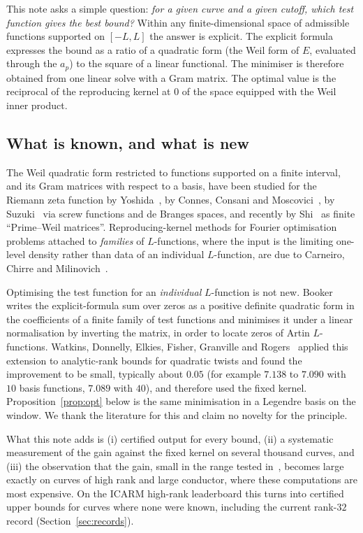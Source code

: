 \documentclass[11pt]{amsart}
\renewcommand{\S}{\ensuremath{\mathsection}}
\theoremstyle{remark}
\theoremstyle{definition}
\begin{document}
This note asks a simple question: \emph{for a given curve and a given cutoff, which test function gives the best bound?} Within any finite-dimensional space of admissible functions supported on $[-L,L]$ the answer is explicit. The explicit formula expresses the bound as a ratio of a quadratic form (the Weil form of $E$, evaluated through the $a_p$) to the square of a linear functional. The minimiser is therefore obtained from one linear solve with a Gram matrix. The optimal value is the reciprocal of the reproducing kernel at $0$ of the space equipped with the Weil inner product.

\subsection*{What is known, and what is new}
The Weil quadratic form restricted to functions supported on a finite interval, and its Gram matrices with respect to a basis, have been studied for the Riemann zeta function by Yoshida~\cite{Yoshida}, by Connes, Consani and Moscovici~\cite{CCM}, by Suzuki~\cite{Suzuki} via screw functions and de Branges spaces, and recently by Shi~\cite{Shi} as finite ``Prime--Weil matrices''. Reproducing-kernel methods for Fourier optimisation problems attached to \emph{families} of $L$-functions, where the input is the limiting one-level density rather than data of an individual $L$-function, are due to Carneiro, Chirre and Milinovich~\cite{CCMil}.

Optimising the test function for an \emph{individual} $L$-function is not new. Booker~\cite[\S3]{Booker} writes the explicit-formula sum over zeros as a positive definite quadratic form in the coefficients of a finite family of test functions and minimises it under a linear normalisation by inverting the matrix, in order to locate zeros of Artin $L$-functions. Watkins, Donnelly, Elkies, Fisher, Granville and Rogers~\cite[\S7]{Watkins} applied this extension to analytic-rank bounds for quadratic twists and found the improvement to be small, typically about $0.05$ (for example $7.138$ to $7.090$ with $10$ basis functions, $7.089$ with $40$), and therefore used the fixed kernel. Proposition~\ref{prop:opt} below is the same minimisation in a Legendre basis on the window. We thank the literature for this and claim no novelty for the principle.

What this note adds is (i) certified output for every bound, (ii) a systematic measurement of the gain against the fixed kernel on several thousand curves, and (iii) the observation that the gain, small in the range tested in~\cite{Watkins}, becomes large exactly on curves of high rank and large conductor, where these computations are most expensive. On the ICARM high-rank leaderboard this turns into certified upper bounds for curves where none were known, including the current rank-$32$ record (Section~\ref{sec:records}).
\end{document}
